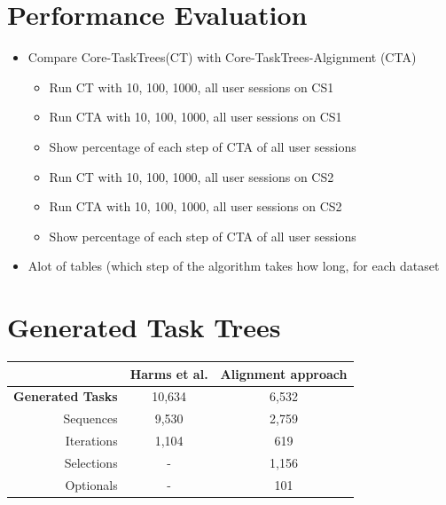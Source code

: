 \section{Performance Evaluation}
\begin{itemize}
	\item Compare Core-TaskTrees(CT) with Core-TaskTrees-Algignment (CTA)
	\begin{itemize}
		\item Run CT with 10, 100, 1000, all user sessions on CS1
		\item Run CTA with 10, 100, 1000, all user sessions on CS1
		\item Show percentage of each step of CTA of all user sessions
		\item Run CT with 10, 100, 1000, all user sessions on CS2
		\item Run CTA with 10, 100, 1000, all user sessions on CS2
		\item Show percentage of each step of CTA of all user sessions
	\end{itemize}
	\item Alot of tables (which step of the algorithm takes how long, for each dataset
\end{itemize}

\section{Generated Task Trees}
\begin{table}
	\centering
 \begin{tabular}{|r|c|c|}
	   \hline
	      & \textbf{Harms et al.} & \textbf{Alignment approach} \\
	     \hline
	       \textbf{Generated Tasks} & 10,634 & 6,532 \\
	       Sequences & 9,530 & 2,759 \\
	       Iterations & 1,104 & 619 \\
	       Selections & -& 1,156 \\
	       Optionals & -& 101 \\
	       \hline
\end{tabular}
\end{table}


